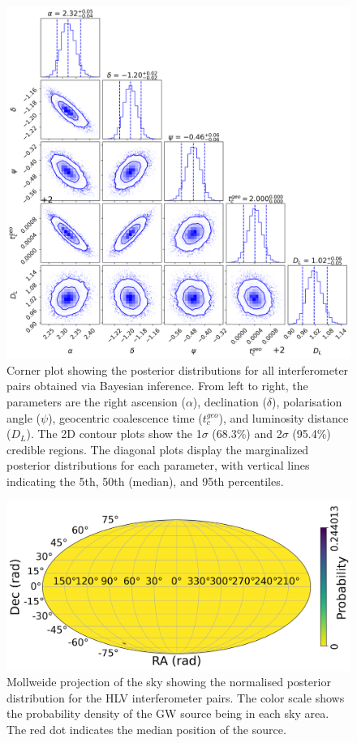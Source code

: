 \documentclass[11pt,a4paper]{article}
\begin{document}
\begin{figure}
    \includegraphics[width=\columnwidth, keepaspectratio]{../figures/corner_HLV.png}
    \caption{Corner plot showing the posterior distributions for all interferometer pairs obtained via Bayesian inference. From left to right, the parameters are the right ascension ($\alpha$), declination ($\delta$), polarisation angle ($\psi$), geocentric coalescence time ($t_c^{geo}$), and luminosity distance ($D_L$). The 2D contour plots show the 1$\sigma$ (68.3\%) and 2$\sigma$ (95.4\%) credible regions. The diagonal plots display the marginalized posterior distributions for each parameter, with vertical lines indicating the 5th, 50th (median), and 95th percentiles.}
    \label{fig:posterior_hlv}
\end{figure}

\begin{figure}
    \includegraphics[width=\columnwidth, keepaspectratio]{../figures/posterior_map_HLV.png}
    \caption{Mollweide projection of the sky showing the normalised posterior distribution for the HLV interferometer pairs. The color scale shows the probability density of the GW source being in each sky area. The red dot indicates the median position of the source.}
    \label{fig:sky_hlv}
\end{figure}
\end{document}
